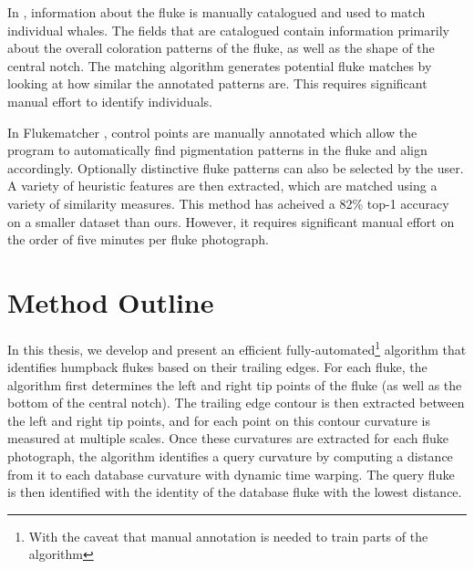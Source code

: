In \cite{mizroch1990computer}, information about the fluke is manually catalogued and used to match individual whales. 
The fields that are catalogued contain information primarily about the overall coloration patterns of the fluke, as well as the shape of the central notch. 
The matching algorithm generates potential fluke matches by looking at how similar the annotated patterns are.
This requires significant manual effort to identify individuals.

In Flukematcher \cite{kniest2010fluke}, control points are manually annotated which allow the program to automatically find pigmentation patterns in the fluke and align accordingly.
Optionally distinctive fluke patterns can also be selected by the user.
A variety of heuristic features are then extracted, which are matched using a variety of similarity measures.
This method has acheived a 82\% top-1 accuracy  on a smaller dataset than ours.
However, it requires significant manual effort on the order of five minutes per fluke photograph.

\section{Method Outline}


In this thesis, we develop and present an efficient fully-automated\footnote{With the caveat that manual annotation is needed to train parts of the algorithm} algorithm that identifies humpback flukes based on their trailing edges.
For each fluke, the algorithm first determines the left and right tip points of the fluke (as well as the bottom of the central notch). 
The trailing edge contour is then extracted between the left and right tip points, and for each point on this contour curvature is measured at multiple scales.
Once these curvatures are extracted for each fluke photograph, the algorithm identifies a query curvature by computing a distance from it to each database curvature with dynamic time warping.
The query fluke is then identified with the identity of the database fluke with the lowest distance.


